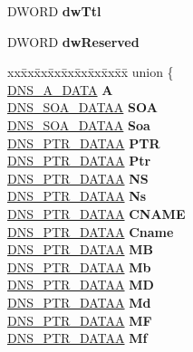 \begin{DoxyCompactItemize}
\begin{tabbing}
\end{tabbing}\item 
\mbox{\label{struct___dns_record_a_a123b51fffbd5411f21d4535f30dbf7cf}} 
D\+W\+O\+RD {\bfseries dw\+Ttl}
\item 
\mbox{\label{struct___dns_record_a_ada676e609bbab1c2c3d7f2d063f78218}} 
D\+W\+O\+RD {\bfseries dw\+Reserved}
\item 
\mbox{\label{struct___dns_record_a_a22ef5abdaf5bef31b752dc15832d40b3}} 
\begin{tabbing}
xx\=xx\=xx\=xx\=xx\=xx\=xx\=xx\=xx\=\kill
union \{\\
\>\hyperlink{struct_d_n_s___a___d_a_t_a}{DNS\_A\_DATA} {\bfseries A}\\
\>\hyperlink{struct_d_n_s___s_o_a___d_a_t_a_a}{DNS\_SOA\_DATAA} {\bfseries SOA}\\
\>\hyperlink{struct_d_n_s___s_o_a___d_a_t_a_a}{DNS\_SOA\_DATAA} {\bfseries Soa}\\
\>\hyperlink{struct_d_n_s___p_t_r___d_a_t_a_a}{DNS\_PTR\_DATAA} {\bfseries PTR}\\
\>\hyperlink{struct_d_n_s___p_t_r___d_a_t_a_a}{DNS\_PTR\_DATAA} {\bfseries Ptr}\\
\>\hyperlink{struct_d_n_s___p_t_r___d_a_t_a_a}{DNS\_PTR\_DATAA} {\bfseries NS}\\
\>\hyperlink{struct_d_n_s___p_t_r___d_a_t_a_a}{DNS\_PTR\_DATAA} {\bfseries Ns}\\
\>\hyperlink{struct_d_n_s___p_t_r___d_a_t_a_a}{DNS\_PTR\_DATAA} {\bfseries CNAME}\\
\>\hyperlink{struct_d_n_s___p_t_r___d_a_t_a_a}{DNS\_PTR\_DATAA} {\bfseries Cname}\\
\>\hyperlink{struct_d_n_s___p_t_r___d_a_t_a_a}{DNS\_PTR\_DATAA} {\bfseries MB}\\
\>\hyperlink{struct_d_n_s___p_t_r___d_a_t_a_a}{DNS\_PTR\_DATAA} {\bfseries Mb}\\
\>\hyperlink{struct_d_n_s___p_t_r___d_a_t_a_a}{DNS\_PTR\_DATAA} {\bfseries MD}\\
\>\hyperlink{struct_d_n_s___p_t_r___d_a_t_a_a}{DNS\_PTR\_DATAA} {\bfseries Md}\\
\>\hyperlink{struct_d_n_s___p_t_r___d_a_t_a_a}{DNS\_PTR\_DATAA} {\bfseries MF}\\
\>\hyperlink{struct_d_n_s___p_t_r___d_a_t_a_a}{DNS\_PTR\_DATAA} {\bfseries Mf}\\

\end{tabbing}
\end{DoxyCompactItemize}
